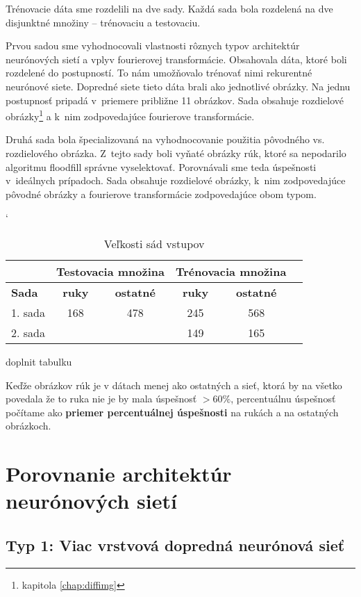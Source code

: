 Trénovacie dáta sme rozdelili na dve sady. Každá sada bola rozdelená na dve disjunktné množiny -- trénovaciu a testovaciu. 

Prvou sadou sme vyhodnocovali vlastnosti rôznych typov architektúr neurónových sietí a vplyv fourierovej transformácie. Obsahovala dáta, ktoré boli rozdelené do postupností. To nám umožňovalo trénovať nimi rekurentné neurónové siete. Dopredné siete tieto dáta brali ako jednotlivé obrázky. Na jednu postupnosť pripadá v~priemere približne 11 obrázkov. Sada obsahuje rozdielové obrázky\footnote{kapitola \ref{chap:diffimg}} a k~nim zodpovedajúce fourierove transformácie.

Druhá sada bola špecializovaná na vyhodnocovanie použitia pôvodného vs. rozdielového obrázka. Z~tejto sady boli vyňaté obrázky rúk, ktoré sa nepodarilo algoritmu floodfill správne vyselektovať. Porovnávali sme teda úspešnosti v~ideálnych prípadoch. Sada obsahuje rozdielové obrázky, k~nim zodpovedajúce pôvodné obrázky a fourierove transformácie zodpovedajúce obom typom.

\begin{table}[h]
\catcode` %
\centering
\begin{tabular}{|l|c|c|c|c|c|}
\cline{2-5}
\multicolumn{1}{l}{} & \multicolumn{2}{|c|}{\textbf{Testovacia množina}} & \multicolumn{2}{c|}{\textbf{Trénovacia množina}}\\ 
\hline
\textbf{Sada} & \textbf{ruky} & \textbf{ostatné} & \textbf{ruky} & \textbf{ostatné} \\ \hline
1. sada & 168 & 478 & 245  & 568 \\ \hline
2. sada & & & 149 & 165 \\ 
\hline
\end{tabular}
\caption{Veľkosti sád vstupov}
\label{tab:neuroncountcmp}
\end{table}

\todo doplnit tabulku

Keďže obrázkov rúk je v dátach menej ako ostatných a sieť, ktorá by na všetko povedala že to ruka nie je by mala úspešnosť $>60\%$, percentuálnu úspešnosť počítame ako \textbf{priemer percentuálnej úspešnosti} na rukách a na ostatných obrázkoch.

\section{Porovnanie architektúr neurónových sietí}

\subsection{Typ 1: Viac vrstvová dopredná neurónová sieť}

